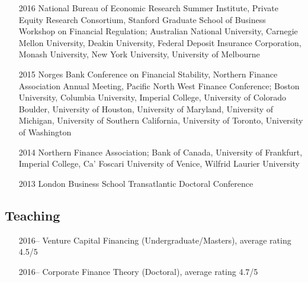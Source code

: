 \documentclass[11pt]{article}
\begin{document}
\begin{itemize}
    \item[2016] National Bureau of Economic Research Summer Institute, Private Equity Research Consortium, Stanford Graduate School of Business Workshop on Financial Regulation; Australian National University, Carnegie Mellon University, Deakin University, Federal Deposit Insurance Corporation, Monash University, New York University, University of Melbourne

    \item[2015] Norges Bank Conference on Financial Stability, Northern Finance Association Annual Meeting, Pacific North West Finance Conference; Boston University, Columbia University, Imperial College, University of Colorado Boulder, University of Houston, University of Maryland, University of Michigan, University of Southern California, University of Toronto, University of Washington

    \item[2014] Northern Finance Association; Bank of Canada, University of Frankfurt, Imperial College, Ca' Foscari University of Venice, Wilfrid Laurier University

    \item[2013] London Business School Transatlantic Doctoral Conference
\end{itemize}

\subsection*{Teaching}
\begin{itemize}
    \item[2016--] Venture Capital Financing (Undergraduate/Masters), average rating 4.5/5
    \item[2016--] Corporate Finance Theory (Doctoral), average rating 4.7/5
\end{itemize}
\end{document}
